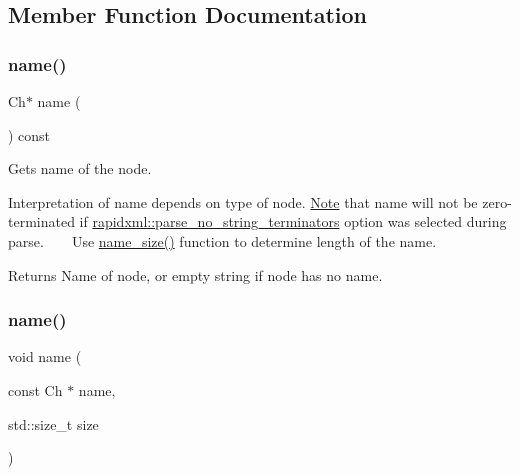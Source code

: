 \subsection{Member Function Documentation}
\mbox{\label{classrapidxml_1_1xml__base_af8436e9ee14c127220113eaa956eafee}} 
\subsubsection{\texorpdfstring{name()}{name()}\hspace{0.1cm}{\footnotesize\ttfamily [1/3]}}
{\footnotesize\ttfamily Ch$\ast$ name (\begin{DoxyParamCaption}{ }\end{DoxyParamCaption}) const\hspace{0.3cm}{\ttfamily [inline]}}



Gets name of the node. 

Interpretation of name depends on type of node. \mbox{\hyperlink{classNote}{Note}} that name will not be zero-\/terminated if \mbox{\hyperlink{namespacerapidxml_a9cae3801e70437cbc410c24bf6be691c}{rapidxml\+::parse\+\_\+no\+\_\+string\+\_\+terminators}} option was selected during parse. ~\newline
~\newline
 Use \mbox{\hyperlink{classrapidxml_1_1xml__base_ad01e2eff02202b130baad012d1ed7328}{name\+\_\+size()}} function to determine length of the name. \begin{DoxyReturn}{Returns}
Name of node, or empty string if node has no name. 
\end{DoxyReturn}
\mbox{\label{classrapidxml_1_1xml__base_a4e7e23d06d48126c65b1f6266acfba5c}} 
\subsubsection{\texorpdfstring{name()}{name()}\hspace{0.1cm}{\footnotesize\ttfamily [2/3]}}
{\footnotesize\ttfamily void name (\begin{DoxyParamCaption}\item[{const Ch $\ast$}]{name,  }\item[{std\+::size\+\_\+t}]{size }\end{DoxyParamCaption})\hspace{0.3cm}{\ttfamily [inline]}}



